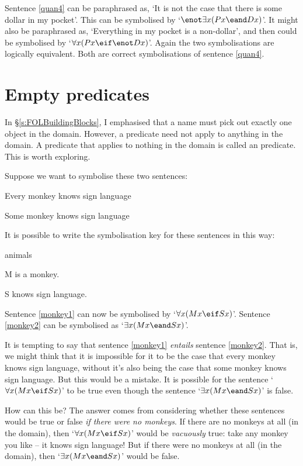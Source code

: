 Sentence \ref{quan4} can be paraphrased as, `It is not the case that there is some dollar in my pocket'. This can be symbolised by `$\enot\exists x(Px \eand Dx)$'. It might also be paraphrased as, `Everything in my pocket is a non-dollar', and then could be symbolised by `$\forall x(Px \eif \enot Dx)$'. Again the two symbolisations are logically equivalent. Both are correct symbolisations of sentence \ref{quan4}.


\section{Empty predicates}
In §\ref{s:FOLBuildingBlocks}, I emphasised that a name must pick out exactly one object in the domain. However, a predicate need not apply to anything in the domain. A predicate that applies to nothing in the domain is called an  predicate. This is worth exploring.

Suppose we want to symbolise these two sentences:
	\begin{earg}
		\item[\ex{monkey1}] Every monkey knows sign language
		\item[\ex{monkey2}] Some monkey knows sign language
	\end{earg}
It is possible to write the symbolisation key for these sentences in this way:
	\begin{ekey}
		\item[\text{domain}] animals
		\item[M]  is a monkey.
		\item[S]  knows sign language.
	\end{ekey}
Sentence \ref{monkey1} can now be symbolised by `$\forall x(Mx \eif Sx)$'. Sentence \ref{monkey2} can be symbolised as `$\exists x(Mx \eand Sx)$'.

It is tempting to say that sentence \ref{monkey1} \emph{entails} sentence \ref{monkey2}. That is, we might think that it is impossible for it to be the case that every monkey knows sign language, without it's also being the case that some monkey knows sign language.  But this would be a mistake. It is possible for the sentence `$\forall x(Mx \eif Sx)$' to be true even though the sentence `$\exists x(Mx \eand Sx)$' is false.

How can this be? The answer comes from considering whether these sentences would be true or false \emph{if there were no monkeys}. If there are no monkeys at all (in the domain), then `$\forall x(Mx \eif Sx)$' would be \emph{vacuously} true: take any monkey you like – it knows sign language! But if there were no monkeys at all (in the domain), then `$\exists x(Mx \eand Sx)$' would be false.

